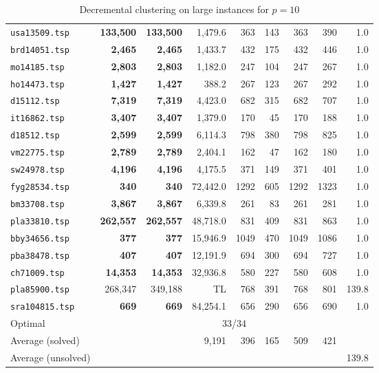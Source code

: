 \documentclass[ijoo,nonblindrev]{informs-ijoo}
\begin{document}
\begin{table}[!hbtp]
{\begin{tabular}{|l|rrrrrrrr|}
			\texttt{usa13509.tsp} & \textbf{133,500} & \textbf{133,500} & 1,479.6 & 363 & 143 & 363 & 390 & 1.0\\
			\texttt{brd14051.tsp} & \textbf{2,465} & \textbf{2,465} & 1,433.7 & 432 & 175 & 432 & 446 & 1.0\\
			\texttt{mo14185.tsp} & \textbf{2,803} & \textbf{2,803} & 1,182.0 & 247 & 104 & 247 & 267 & 1.0\\
			\texttt{ho14473.tsp} & \textbf{1,427} & \textbf{1,427} & 388.2 & 267 & 123 & 267 & 292 & 1.0\\
			\texttt{d15112.tsp} & \textbf{7,319} & \textbf{7,319} & 4,423.0 & 682 & 315 & 682 & 707 & 1.0\\
			\texttt{it16862.tsp} & \textbf{3,407} & \textbf{3,407} & 1,379.0 & 170 & 45 & 170 & 188 & 1.0\\
			\texttt{d18512.tsp} & \textbf{2,599} & \textbf{2,599} & 6,114.3 & 798 & 380 & 798 & 825 & 1.0\\
			\texttt{vm22775.tsp} & \textbf{2,789} & \textbf{2,789} & 2,404.1 & 162 & 47 & 162 & 180 & 1.0\\
			\texttt{sw24978.tsp} & \textbf{4,196} & \textbf{4,196} & 4,175.5 & 371 & 149 & 371 & 401 & 1.0\\
			\texttt{fyg28534.tsp} & \textbf{340} & \textbf{340} & 72,442.0 & 1292 & 605 & 1292 & 1323 & 1.0\\
			\texttt{bm33708.tsp} & \textbf{3,867} & \textbf{3,867} & 6,339.8 & 261 & 83 & 261 & 281 & 1.0\\
			\texttt{pla33810.tsp} & \textbf{262,557} & \textbf{262,557} & 48,718.0 & 831 & 409 & 831 & 863 & 1.0\\
			\texttt{bby34656.tsp} & \textbf{377} & \textbf{377} & 15,946.9 & 1049 & 470 & 1049 & 1086 & 1.0\\
			\texttt{pba38478.tsp} & \textbf{407} & \textbf{407} & 12,191.9 & 694 & 300 & 694 & 727 & 1.0\\
			\texttt{ch71009.tsp} & \textbf{14,353} & \textbf{14,353} & 32,936.8 & 580 & 227 & 580 & 608 & 1.0\\
			\texttt{pla85900.tsp} & 268,347 & 349,188 & TL & 768 & 391 & 768 & 801 & 139.8\\
			\texttt{sra104815.tsp} & \textbf{669} & \textbf{669} & 84,254.1 & 656 & 290 & 656 & 690 & 1.0\\
			\hline
			Optimal &  \multicolumn{8}{|c|}{33/34}\\
			Average (solved) & & & 9,191 & 396 & 165 & 509 & 421 & \\
			Average (unsolved) & & & & & & & & 139.8\\
			\hline
	\end{tabular}}
	\caption{Decremental clustering on large instances for $p = 10$\label{table:large:p10}}
\end{table}
\end{document}
